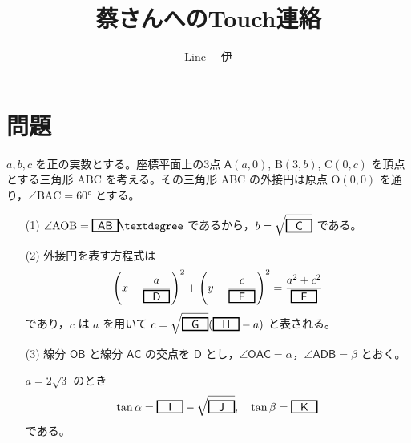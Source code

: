 \documentclass[dvipdfmx,a4paper,12pt]{jarticle}
\title{\vspace{-3cm} 蔡さんへのTouch連絡}  %
\author{Linc\ -\ 伊}  %
\date{}  %
\theoremstyle{mystyle}
\newcommand{\ab}[1]{%
\begin{tikzpicture}[baseline]
\node[draw=black, 
      rectangle, 
      minimum width=0.8cm, 
      minimum height=0.3cm, 
      font=\bfseries,
      line width=1pt,
      inner sep=2pt,
      anchor=base] {$#1$};
\end{tikzpicture}%
}
\begin{document}
\maketitle
\section*{\textbf{問題}}
$a, b, c$ を正の実数とする。座標平面上の3点 $\mathsf{A}(a, 0)$, $\mathrm{B}(3, b)$, $\mathrm{C}(0, c)$ を頂点とする三角形 $\mathrm{ABC}$ を考える。その三角形 $\mathrm{ABC}$ の外接円は原点 $\mathrm{O}(0, 0)$ を通り，$\angle \mathrm{BAC} = 60°$ とする。

\begin{enumerate}
\item[(1)] $\angle \mathrm{AOB} = \ab{\mathsf{AB}}°$ であるから，$b = \sqrt{\ab{\mathsf{C}}}$ である。

\item[(2)] 外接円を表す方程式は
\begin{align*}
\left(x - \frac{a}{\ab{\mathsf{D}}}\right)^2 + \left(y - \frac{c}{\ab{\mathsf{E}}}\right)^2 = \frac{a^2 + c^2}{\ab{\mathsf{F}}} 
\end{align*}
であり，$c$ は $a$ を用いて $c = \sqrt{\ab{\mathsf{G}}}(\ab{\mathsf{H}} - a)$ と表される。

\item[(3)] 線分 $\mathsf{OB}$ と線分 $\mathsf{AC}$ の交点を $\mathsf{D}$ とし，$\angle \mathsf{OAC} = \alpha$，$\angle \mathsf{ADB} = \beta$ とおく。

$a = 2\sqrt{3}$ のとき
\begin{align*}
\tan \alpha = \ab{\mathsf{I}} - \sqrt{\ab{\mathsf{J}}}, \quad \tan \beta = \ab{\mathsf{K}}
\end{align*}
である。
\end{enumerate}
\newpage
\end{document}
